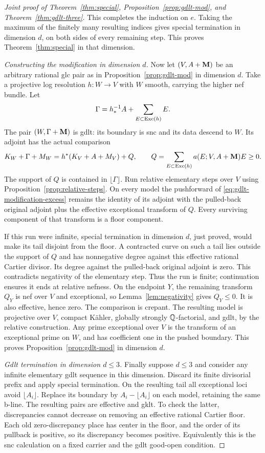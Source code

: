 \begin{proof}[Joint proof of Theorem~\ref{thm:special},
Proposition~\ref{prop:gdlt-mod}, and Theorem~\ref{thm:gdlt-three}]
This completes the induction on $e$.  Taking the
maximum of the finitely many resulting indices gives
special termination in dimension $d$, on both sides
of every remaining step.  This proves
Theorem~\ref{thm:special} in that dimension.

\smallskip
\noindent\emph{Constructing the modification in dimension $d$.}
Now let $(V,A+\mathbf M)$ be an arbitrary rational glc pair
as in Proposition~\ref{prop:gdlt-mod} in dimension $d$.
Take a projective log resolution $h:W\to V$ with $W$ smooth,
carrying the higher nef bundle.  Let
\[
 \Gamma=h_*^{-1}A+\sum_{E\subset\operatorname{Exc}(h)}E.
\]
The pair $(W,\Gamma+\mathbf M)$ is gdlt: its boundary is
snc and its data descend to $W$.  Its adjoint has
the actual comparison
\begin{equation}\label{eq:gdlt-modification-excess}
 K_W+\Gamma+M_W=h^*(K_V+A+M_V)+Q,
 \qquad
 Q=\sum_{E\subset\operatorname{Exc}(h)}
       a(E;V,A+\mathbf M)E\geq0.
\end{equation}
The support of $Q$ is contained in $\lfloor\Gamma\rfloor$.
Run relative elementary steps over $V$ using
Proposition~\ref{prop:relative-steps}.  On every model
the pushforward of \eqref{eq:gdlt-modification-excess}
remains the identity of its adjoint with the pulled-back
original adjoint plus the effective exceptional
transform of $Q$.  Every surviving component of that
transform is a floor component.

If this run were infinite, special termination in
dimension $d$, just proved, would make its tail
disjoint from the floor.  A contracted curve on such
a tail lies outside the support of $Q$ and has
nonnegative degree against this effective rational
Cartier divisor.  Its degree against the pulled-back
original adjoint is zero.  This contradicts negativity
of the elementary step.  Thus the run is finite;
continuation ensures it ends at relative nefness.
On the endpoint $Y$, the remaining transform $Q_Y$
is nef over $V$ and exceptional, so
Lemma~\ref{lem:negativity} gives $Q_Y\leq0$.  It is
also effective, hence zero.  The comparison is
crepant.  The resulting model is projective over $V$,
compact K\"ahler, globally strongly $\mathbb Q$-factorial,
and gdlt, by the relative construction.  Any prime
exceptional over $V$ is the transform of an
exceptional prime on $W$, and has coefficient one
in the pushed boundary.  This proves
Proposition~\ref{prop:gdlt-mod} in dimension $d$.

\smallskip
\noindent\emph{Gdlt termination in dimension $d\leq3$.}
Finally suppose $d\leq3$ and consider any infinite
elementary gdlt sequence in this dimension.  Discard
its finite divisorial prefix and apply special
termination.  On the resulting tail all exceptional
loci avoid $\lfloor A_i\rfloor$.  Replace its boundary
by $A_i-\lfloor A_i\rfloor$ on each model, retaining
the same b-line.  The resulting pairs are effective
and gklt.  To check the latter, discrepancies cannot
decrease on removing an effective rational Cartier
floor.  Each old zero-discrepancy place has center
in the floor, and the order of its pullback is
positive, so its discrepancy becomes positive.
Equivalently this is the snc calculation on a fixed
carrier and the gdlt good-open condition.


\end{proof}
